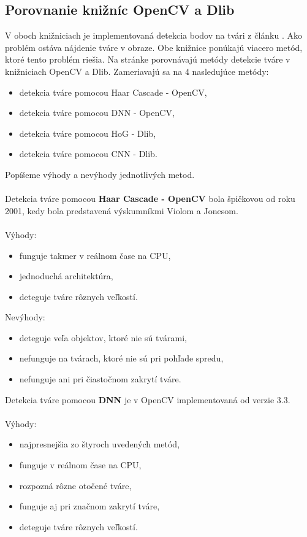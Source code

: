 \subsection{Porovnanie knižníc OpenCV a Dlib} \label{OpenCVvsDlibNadpis}
V oboch knižniciach je implementovaná detekcia bodov na tvári z článku \cite{kazemi2014one}.
Ako problém ostáva nájdenie tváre v obraze.
Obe knižnice ponúkajú viacero metód, ktoré tento problém riešia.
Na stránke \cite{OpenCVvsDlib} porovnávajú metódy detekcie tváre v knižniciach OpenCV a Dlib. 
Zameriavajú sa na 4 nasledujúce metódy:
\begin{itemize}
	\item detekcia tváre pomocou Haar Cascade - OpenCV,
	\item detekcia tváre pomocou DNN - OpenCV,
	\item detekcia tváre pomocou HoG - Dlib,
	\item detekcia tváre pomocou CNN - Dlib.\\
\end{itemize}
Popíšeme výhody a nevýhody jednotlivých metod.\\
\\Detekcia tváre pomocou \textbf{Haar Cascade - OpenCV} bola špičkovou od roku 2001, kedy bola predstavená výskumníkmi Violom a Jonesom.\\
\\Výhody:
\begin{itemize}
	\item funguje takmer v reálnom čase na CPU,
	\item jednoduchá architektúra,
	\item deteguje tváre rôznych veľkostí.
\end{itemize}
Nevýhody:
\begin{itemize}
	\item deteguje veľa objektov, ktoré nie sú tvárami,
	\item nefunguje na tvárach, ktoré nie sú pri pohľade spredu,
	\item nefunguje ani pri čiastočnom zakrytí tváre.\\
\end{itemize}
Detekcia tváre pomocou \textbf{DNN} je v OpenCV implementovaná od verzie 3.3. \\
\\Výhody:
\begin{itemize}
	\item najpresnejšia zo štyroch uvedených metód,
	\item funguje v reálnom čase na CPU,
	\item rozpozná rôzne otočené tváre,
	\item funguje aj pri značnom zakrytí tváre,
	\item deteguje tváre rôznych veľkostí.
\end{itemize}
